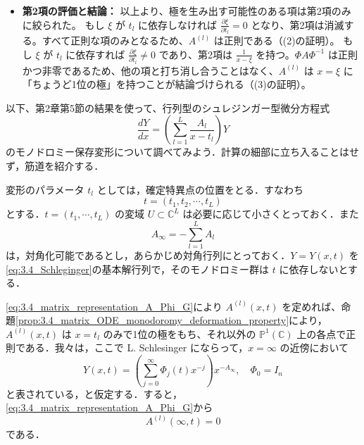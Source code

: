 \begin{Q}
\begin{itemize}
    したがって、
    \begin{align*}
      \text{第3項} &= \Phi \cdot (x-\xi)^A \left( \frac{\partial G}{\partial t_l}G^{-1} \right) (x-\xi)^{-A} \cdot \Phi^{-1} \\
      &= \Phi \cdot \left( \frac{\partial G}{\partial t_l}G^{-1} \right) (x-\xi)^A (x-\xi)^{-A} \cdot \Phi^{-1} \\
      &= \Phi \left( \frac{\partial G}{\partial t_l}G^{-1} \right) \Phi^{-1}
    \end{align*}
    となり、なんと $x-\xi$ の依存性が完全に消滅する！ $\Phi$ も $G$ も正則であるため、第3項も完全に正則であることが厳密に保証される。
    
    \item \textbf{第2項の評価と結論：}
    以上より、極を生み出す可能性のある項は第2項のみに絞られた。
    もし $\xi$ が $t_l$ に依存しなければ $\frac{\partial \xi}{\partial t_l} = 0$ となり、第2項は消滅する。すべて正則な項のみとなるため、$A^{(l)}$ は正則である（(2)の証明）。
    もし $\xi$ が $t_l$ に依存すれば $\frac{\partial \xi}{\partial t_l} \neq 0$ であり、第2項は $\frac{1}{x-\xi}$ を持つ。$\Phi A \Phi^{-1}$ は正則かつ非零であるため、他の項と打ち消し合うことはなく、$A^{(l)}$ は $x=\xi$ に「ちょうど1位の極」を持つことが結論づけられる（(3)の証明）。
\end{itemize}
\end{Q}

以下、第2章第5節の結果を使って、行列型のシュレジンガー型微分方程式
\begin{equation}\label{eq:3.4_Schleginger}
  \frac{dY}{dx} = \left( \sum_{l=1}^L \frac{A_l}{x-t_l} \right) Y
\end{equation}
のモノドロミー保存変形について調べてみよう．計算の細部に立ち入ることはせず，筋道を紹介する．

変形のパラメータ $t_l$ としては，確定特異点の位置をとる．すなわち
\[
  t = (t_1, t_2, \cdots, t_L)
\]
とする．$t=(t_1, \cdots, t_L)$ の変域 $U \subset \mathbb{C}^L$ は必要に応じて小さくとっておく．また
\[
  A_\infty = - \sum_{l=1}^L A_l
\]
は，対角化可能であるとし，あらかじめ対角行列にとっておく．$Y=Y(x,t)$ を\eqref{eq:3.4_Schleginger}の基本解行列で，そのモノドロミー群は $t$ に依存しないとする．

\eqref{eq:3.4_matrix_representation_A_Phi_G}により $A^{(l)}(x,t)$ を定めれば、命題\ref{prop:3.4_matrix_ODE_monodoromy_deformation_property}により，$A^{(l)}(x,t)$ は $x=t_l$ のみで1位の極をもち、それ以外の $\mathbb{P}^1(\mathbb{C})$ 上の各点で正則である．我々は，ここで L. Schlesinger にならって，$x=\infty$ の近傍において
\[
  Y(x,t) = \left( \sum_{j=0}^\infty \Phi_j(t) x^{-j} \right) x^{-A_\infty}, \quad \Phi_0 = I_n
\]
と表されている，と仮定する．すると，\eqref{eq:3.4_matrix_representation_A_Phi_G}から
\[
  A^{(l)}(\infty, t) = 0
\]
である．

